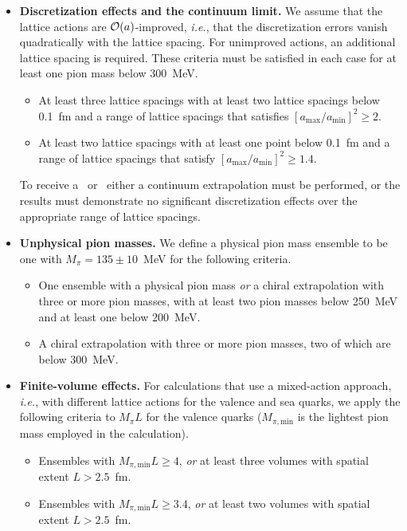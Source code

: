 \begin{itemize}
\item {\bfseries Discretization effects and the continuum limit.}
We assume that the lattice actions are ${\cal O}(a)$-improved, {\it i.e.}, 
that the discretization errors vanish quadratically with the lattice spacing. 
%
For unimproved actions, an additional lattice spacing is required. 
%
These criteria must be satisfied in each case for at 
least one pion mass below 300~MeV.
%
\begin{itemize}
%
\item[\bstar] At least three lattice spacings with at least two lattice 
spacings below 0.1~fm and a range of lattice spacings that satisfies 
$[a_{\mathrm{max}}/a_{\mathrm{min}}]^2 \geq 2$.
%
\item[\bcirc] At least two lattice spacings with at least one point below 
0.1~fm and a range of lattice spacings that satisfy
$[a_{\mathrm{max}}/a_{\mathrm{min}}]^2 \geq 1.4$.
%
\end{itemize}
%
To receive a \bstar~or \bcirc~either a continuum extrapolation must be 
performed, or the results must demonstrate no significant discretization 
effects over the appropriate range of lattice spacings.

\item {\bfseries Unphysical pion masses.}
We define a physical pion mass ensemble to be one with $M_\pi=135\pm 10$~MeV
for the following criteria.
%
\begin{itemize}
\item[\bstar] One ensemble with a physical pion mass \emph{or} a chiral 
extrapolation with three or more pion masses, with at least two pion masses 
below 250~MeV and at least one below 200~MeV.
%
\item[\bcirc] A chiral extrapolation with three or more pion masses, two of 
which are below 300~MeV.
%
\end{itemize}

\item {\bfseries Finite-volume effects.}
%
For calculations that use a mixed-action approach, {\it i.e.},
with different lattice actions for the valence and sea quarks, 
we apply the following criteria to $M_\pi L$ for the valence quarks
($M_{\pi,\mathrm{min}}$ is the lightest pion mass employed in the calculation).
%
\begin{itemize}
%
\item[\bstar] Ensembles with $M_{\pi,\mathrm{min}}L\geq 4$, \emph{or} at least 
three volumes with spatial extent $L>2.5$~fm.
\item[\bcirc] Ensembles with $M_{\pi,\mathrm{min}}L \geq 3.4$, \emph{or} at least 
two volumes with spatial extent $L>2.5$~fm.
\end{itemize}


\end{itemize}
